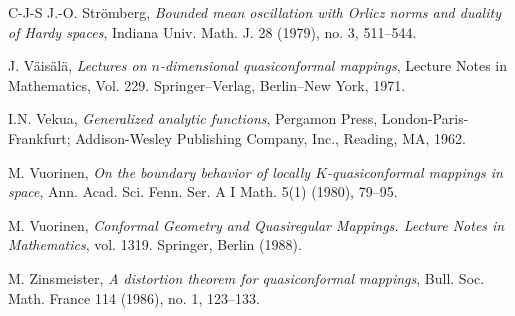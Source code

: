 \documentclass[11pt,a4paper,reqno]{amsart}
\theoremstyle{definition}
\numberwithin{komcounter}{section}
\begin{document}
\begin{thebibliography}{C-J-S}
 J.-O. Str\"omberg, \emph{Bounded mean oscillation with Orlicz norms and duality of Hardy spaces}, Indiana Univ. Math. J. 28 (1979), no. 3, 511--544.

  J. V\"ais\"al\"a, \emph{Lectures on $n$-dimensional quasiconformal mappings}, Lecture Notes in Mathematics, Vol. 229. Springer--Verlag, Berlin--New York, 1971. 

 I.N. Vekua, \emph{Generalized analytic functions}, Pergamon Press, London-Paris-Frankfurt; Addison-Wesley Publishing Company, Inc., Reading, MA, 1962.

 M. Vuorinen, \emph{On the boundary behavior of locally $K$-quasiconformal mappings in space},
Ann. Acad. Sci. Fenn. Ser. A I Math. 5(1) (1980), 79--95.

 M. Vuorinen, \emph{Conformal Geometry and Quasiregular Mappings. Lecture Notes in Mathematics}, vol. 1319. Springer, Berlin (1988).

 M.  Zinsmeister, \emph{A distortion theorem for quasiconformal mappings}, Bull. Soc. Math. France 114 (1986), no. 1, 123--133.
	
	
	
\end{thebibliography}
\end{document}
